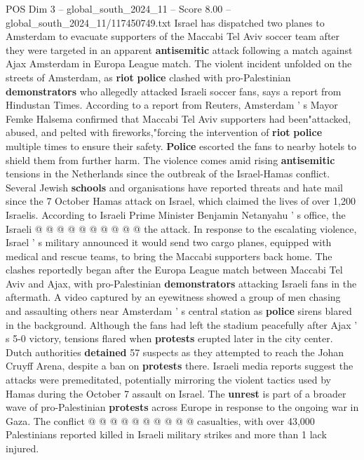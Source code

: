 \begin{textsample}{POS Dim 3 – global\_south\_2024\_11 – Score 8.00 – global\_south\_2024\_11/117450749.txt}  \label{ex:f3_pos_308}
Israel has dispatched two planes to Amsterdam to evacuate supporters of the Maccabi Tel Aviv soccer team after they were targeted in an apparent \textbf{antisemitic} attack following a match against Ajax Amsterdam in Europa League match.
The violent incident unfolded on the streets of Amsterdam, as \textbf{riot} \textbf{police} clashed with pro-Palestinian \textbf{demonstrators} who allegedly attacked Israeli soccer fans, says a report from Hindustan Times.
According to a report from Reuters, Amsterdam ' s Mayor Femke Halsema confirmed that Maccabi Tel Aviv supporters had been"attacked, abused, and pelted with fireworks,"forcing the intervention of \textbf{riot} \textbf{police} multiple times to ensure their safety. \textbf{Police} escorted the fans to nearby hotels to shield them from further harm.
The violence comes amid rising \textbf{antisemitic} tensions in the Netherlands since the outbreak of the Israel-Hamas conflict.
Several Jewish \textbf{schools} and organisations have reported threats and hate mail since the 7 October Hamas attack on Israel, which claimed the lives of over 1,200 Israelis.
According to Israeli Prime Minister Benjamin Netanyahu ' s office, the Israeli @ @ @ @ @ @ @ @ @ @ the attack.
In response to the escalating violence, Israel ' s military announced it would send two cargo planes, equipped with medical and rescue teams, to bring the Maccabi supporters back home.
The clashes reportedly began after the Europa League match between Maccabi Tel Aviv and Ajax, with pro-Palestinian \textbf{demonstrators} attacking Israeli fans in the aftermath.
A video captured by an eyewitness showed a group of men chasing and assaulting others near Amsterdam ' s central station as \textbf{police} sirens blared in the background.
Although the fans had left the stadium peacefully after Ajax ' s 5-0 victory, tensions flared when \textbf{protests} erupted later in the city center.
Dutch authorities \textbf{detained} 57 suspects as they attempted to reach the Johan Cruyff Arena, despite a ban on \textbf{protests} there.
Israeli media reports suggest the attacks were premeditated, potentially mirroring the violent tactics used by Hamas during the October 7 assault on Israel.
The \textbf{unrest} is part of a broader wave of pro-Palestinian \textbf{protests} across Europe in response to the ongoing war in Gaza.
The conflict @ @ @ @ @ @ @ @ @ @ casualties, with over 43,000 Palestinians reported killed in Israeli military strikes and more than 1 lack injured.

\end{textsample}
